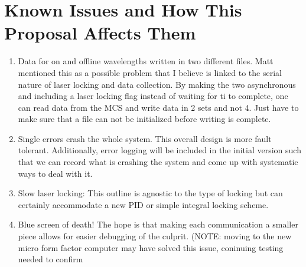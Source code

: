 
\section{Known Issues and How This Proposal Affects Them}

\begin{enumerate}
\item{Data for on and offline wavelengths written in two different files. Matt mentioned this as a possible problem that I believe is linked to the serial nature of laser locking and data collection. By making the two asynchronous and including a laser locking flag instead of waiting for ti to complete, one can read data from the MCS and write data in 2 sets and not 4. Just have to make sure that a file can not be initialized before writing is complete.}
\item{Single errors crash the whole system. This overall design is more fault tolerant. Additionally, error logging will be included in the initial version such that we can record what is crashing the system and come up with systematic ways to deal with it.}
\item{Slow laser locking: This outline is agnostic to the type of locking but can certainly accommodate a new PID or simple integral locking scheme. }
\item{Blue screen of death! The hope is that making each communication a smaller piece allows for easier debugging of the culprit. (NOTE: moving to the new micro form factor computer may have solved this issue, coninuing testing needed to confirm}
\end{enumerate}

\newpage
